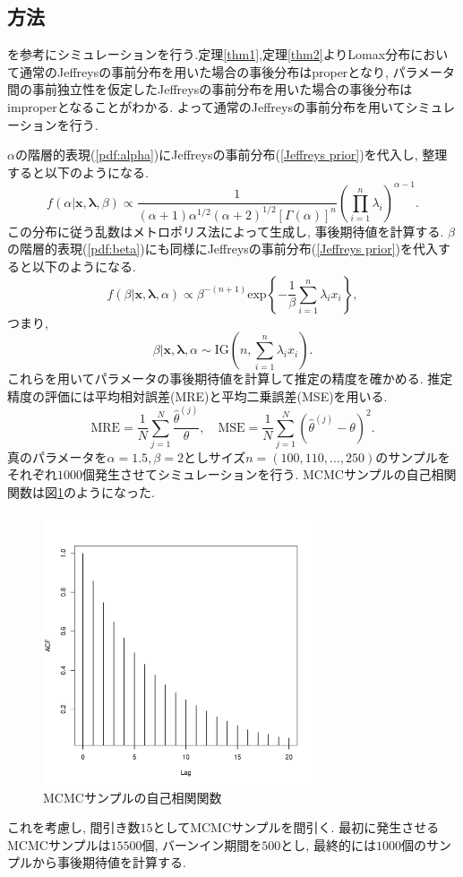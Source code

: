 \documentclass[titlepage,twoside]{jarticle}
\theoremstyle{definition}
\begin{document}
\subsection{方法}

\cite{Lomax2020}を参考にシミュレーションを行う.定理\ref{thm1},定理\ref{thm2}よりLomax分布において通常のJeffreysの事前分布を用いた場合の事後分布はproperとなり, パラメータ間の事前独立性を仮定したJeffreysの事前分布を用いた場合の事後分布はimproperとなることがわかる. よって通常のJeffreysの事前分布を用いてシミュレーションを行う.

$\alpha $の階層的表現(\ref{pdf:alpha})にJeffreysの事前分布(\ref{Jeffreys prior})を代入し, 整理すると以下のようになる.
$$
f(\alpha|\bm{x},\bm{\lambda},\beta )
\propto
\frac{1}{(\alpha +1)\alpha ^{1/2}(\alpha +2)^{1/2}[\Gamma(\alpha )]^n}
\left(\prod_{i=1}^n\lambda _i \right)^{\alpha -1} .
$$
この分布に従う乱数はメトロポリス法によって生成し, 事後期待値を計算する.
$\beta $の階層的表現(\ref{pdf:beta})にも同様にJeffreysの事前分布(\ref{Jeffreys prior})を代入すると以下のようになる.
$$
f(\beta |\bm{x},\bm{\lambda },\alpha )
\propto
\beta ^{-(n+1)}\mbox{exp}\left\{-
\frac{1}{\beta }\sum_{i=1}^n \lambda_i x_i\right\} ,
$$
つまり,
$$
\beta |\bm{x},\bm{\lambda },\alpha
\sim
\mbox{IG}\left(n,\sum_{i=1}^n\lambda _i x_i \right).
$$
これらを用いてパラメータの事後期待値を計算して推定の精度を確かめる. 推定精度の評価には平均相対誤差(MRE)と平均二乗誤差(MSE)を用いる.
$$
\mbox{MRE} = \frac{1}{N}\sum_{j=1}^{N}\frac{\hat{\theta}^{(j)}}{\theta}, \quad
\mbox{MSE} = \frac{1}{N}\sum_{j=1}^{N}(\hat{\theta}^{(j)} - \theta)^2.
$$
真のパラメータを$\alpha = 1.5, \beta = 2$としサイズ$n=(100,110,\ldots,250)$のサンプルをそれぞれ$1000$個発生させてシミュレーションを行う. MCMCサンプルの自己相関関数は図\ref{fig1}のようになった. 
\begin{figure}[ht]
\begin{center}
\includegraphics[width=80mm]{acf}
\caption{MCMCサンプルの自己相関関数}
\label{fig1}
\end{center}
\end{figure}
これを考慮し, 間引き数$15$としてMCMCサンプルを間引く.
最初に発生させるMCMCサンプルは$15500$個, バーンイン期間を$500$とし, 最終的には$1000$個のサンプルから事後期待値を計算する.
\end{document}
